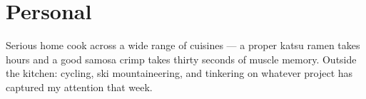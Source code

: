 \documentclass[10pt, letterpaper]{article}
\begin{document}
\section{Personal}

\noindent
Serious home cook across a wide range of cuisines --- a proper katsu ramen takes hours
and a good samosa crimp takes thirty seconds of muscle memory. Outside the kitchen:
cycling, ski mountaineering, and tinkering on whatever project has captured my attention that week.
\end{document}

